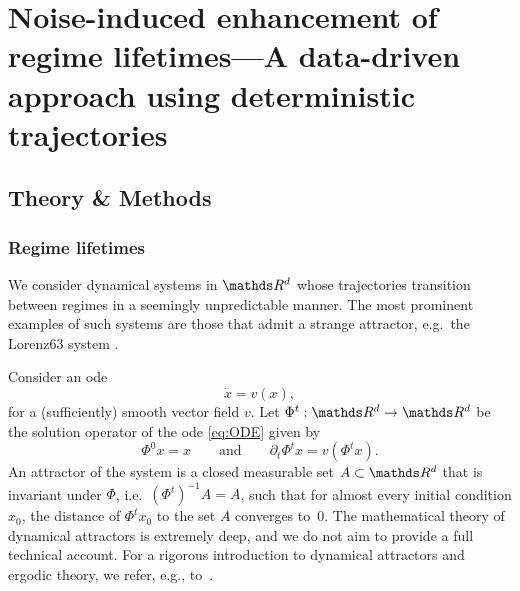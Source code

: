 
\chapter[Stochastic Inertia]{Noise-induced enhancement of regime lifetimes---A data-driven approach
  using deterministic trajectories} %
\label{ch:stochasticInertia}



\section{Theory \& Methods}\label{sec:sI_meth}

\subsection{Regime lifetimes}\label{sec:sI_regime_lifetimes}
We consider dynamical systems in $\R^d$ whose trajectories transition between regimes in a seemingly unpredictable manner. The most prominent examples of such systems are those that admit a strange attractor, e.g.~the Lorenz63 system \parencite{lorenzDeterministicNonperiodicFlow1963}.

Consider an \gls{ode}
\begin{equation}\label{eq:ODE}
    \Dot{x} = v(x),
\end{equation}
for a (sufficiently) smooth vector field $v$.
Let $\Phi^t: \R^d \to \R^d$ be the solution operator of the \gls{ode} \eqref{eq:ODE} given by
\begin{equation}
    \Phi^0 x = x \qquad \text{and} \qquad \partial_t \Phi^t x = v(\Phi^t x).
\end{equation}
An attractor of the system is a closed measurable set $A\subset\R^d$ that is invariant under $\Phi$, i.e.~$(\Phi^t)^{-1} A = A$, such that for almost every initial condition $x_0$, the distance of $\Phi^t x_0$ to the set $A$ converges to~$0$.
The mathematical theory of dynamical attractors is extremely deep, and we do not aim to provide a full technical account. For a rigorous introduction to dynamical attractors and ergodic theory, we refer, e.g., to~\textcite{katokIntroductionModernTheory1995, youngWhatAreSRB2002}.


